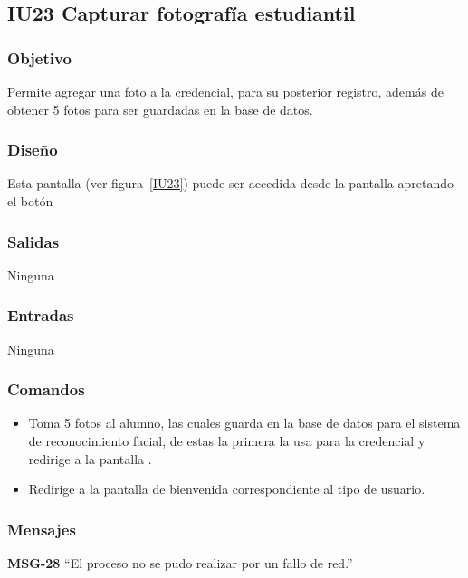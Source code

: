 
\subsection{IU23 Capturar fotografía estudiantil}

\subsubsection{Objetivo}
   Permite agregar una foto a la credencial, para su posterior registro, además de obtener 5 fotos para ser guardadas en la base de datos.
\subsubsection{Diseño}
    Esta pantalla  (ver figura~\ref{IU23}) puede ser accedida desde la pantalla  apretando el botón 


\subsubsection{Salidas}
Ninguna
\subsubsection{Entradas}
Ninguna
\subsubsection{Comandos}
\begin{itemize}
    \item {} Toma 5 fotos al alumno, las cuales guarda en la base de datos para el sistema de reconocimiento facial, de estas la primera la usa para la credencial y redirige a la pantalla .
    \item {} Redirige a la pantalla de bienvenida correspondiente al tipo de usuario.
    
\end{itemize}

\subsubsection{Mensajes}

\begin{Citemize}
    \item {\bf MSG-28}  ``El proceso no se pudo realizar por un fallo de red.''
\end{Citemize}

